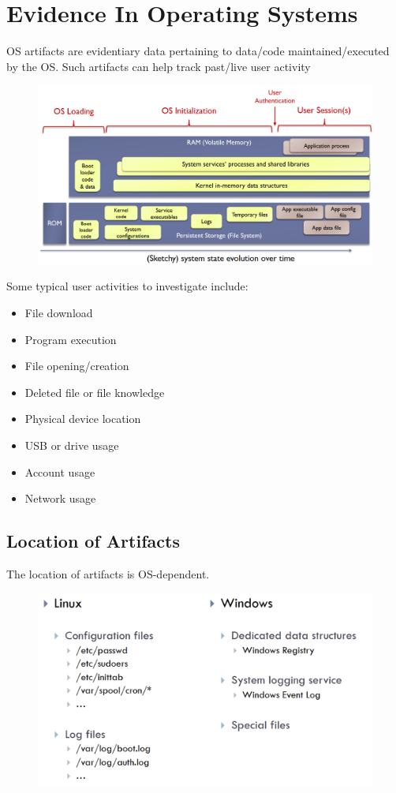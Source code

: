 \documentclass[10pt,a4paper]{report}
\begin{document}
\section{Evidence In Operating Systems}
OS artifacts are evidentiary data pertaining to data/code maintained/executed by the OS. Such artifacts can help track past/live user activity
\begin{figure}[H]
\centering
\includegraphics[scale=0.4]{13.png}
\end{figure}
Some typical user activities to investigate include:
\begin{itemize}
\item File download
\item Program execution
\item File opening/creation
\item Deleted file or file knowledge
\item Physical device location
\item USB or drive usage
\item Account usage
\item Network usage
\end{itemize}
\subsection{Location of Artifacts}
The location of artifacts is OS-dependent.
\begin{figure}[H]
\centering
\includegraphics[scale=0.4]{14.png}
\end{figure}
\end{document}
